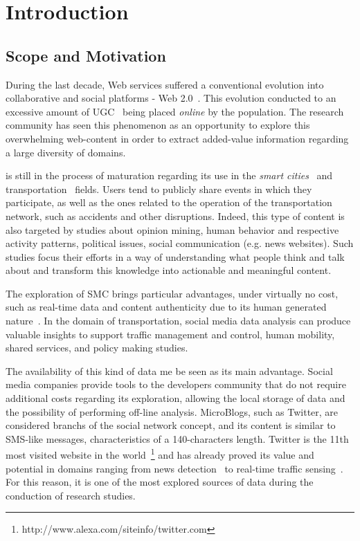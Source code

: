 \chapter{Introduction} \label{chap:intro}

\minitoc \mtcskip \noindent

\section{Scope and Motivation}\label{sec:scope_motivation}

During the last decade, Web services suffered a conventional evolution into collaborative and social platforms - Web 2.0~\cite{chi2008social}. This evolution conducted to an excessive amount of \gls{UGC}~\cite{kaplan2010users} being placed \textit{online} by the population. The research community has seen this phenomenon as an opportunity to explore this overwhelming web-content in order to extract added-value information regarding a large diversity of domains.

 is still in the process of maturation regarding its use in the \textit{smart cities}~\cite{batty2012smart} and transportation~\cite{gal2014potential} fields. Users tend to publicly share events in which they participate, as well as the ones related to the operation of the transportation network, such as accidents and other disruptions. Indeed, this type of content is also targeted by studies about opinion mining, human behavior and respective activity patterns, political issues, social communication (e.g. news websites). Such studies focus their efforts in a way of understanding what people think and talk about and transform this knowledge into actionable and meaningful content. 

The exploration of \gls{SMC} brings particular advantages, under virtually no cost, such as real-time data and content authenticity due to its human generated nature~\cite{kuflik2017automating}. In the domain of transportation, social media data analysis can produce valuable insights to support traffic management and control, human mobility, shared services, and policy making studies. 

The availability of this kind of data me be seen as its main advantage. Social media companies provide tools to the developers community that do not require additional costs regarding its exploration, allowing the local storage of data and the possibility of performing off-line analysis. \glspl{MicroBlog}, such as Twitter, are considered branchs of the social network concept, and its content is similar to SMS-like messages, characteristics of a 140-characters length. Twitter is the 11th most visited website in the world~\footnote{http://www.alexa.com/siteinfo/twitter.com} and has already proved its value and potential in domains ranging from news detection~\cite{kn:Sankaranarayanan2009} to real-time traffic sensing~\cite{carvalho2010real}. For this reason, it is one of the most explored sources of data during the conduction of research studies.

